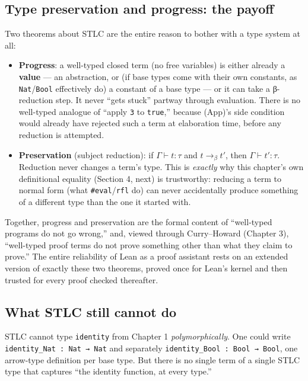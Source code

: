 \subsection{Type preservation and progress: the payoff}\label{sec:05-rigor-check:03-typing-rules-and-safety:5}

Two theorems about STLC are the entire reason to bother with a type system at all:

\begin{itemize}
\tightlist
\item
  \textbf{Progress}: a well-typed closed term (no free variables) is either already a \textbf{value} --- an abstraction, or (if base types come with their own constants, as \texttt{Nat}/\texttt{Bool} effectively do) a constant of a base type --- or it can take a β-reduction step. It never ``gets stuck'' partway through evaluation. There is no well-typed analogue of ``apply \texttt{3} to \texttt{true},'' because (App)'s side condition would already have rejected such a term at elaboration time, before any reduction is attempted.
\item
  \textbf{Preservation} (subject reduction): if \(\Gamma \vdash t : \tau\) and \(t \longrightarrow_\beta t'\), then \(\Gamma \vdash t' : \tau\). Reduction never changes a term's type. This is \emph{exactly} why this chapter's own definitional equality (Section 4, next) is trustworthy: reducing a term to normal form (what \texttt{\#eval}/\texttt{rfl} do) can never accidentally produce something of a different type than the one it started with.
\end{itemize}

Together, progress and preservation are the formal content of ``well-typed programs do not go wrong,'' and, viewed through Curry--Howard (Chapter 3), ``well-typed proof terms do not prove something other than what they claim to prove.'' The entire reliability of Lean as a proof assistant rests on an extended version of exactly these two theorems, proved once for Lean's kernel and then trusted for every proof checked thereafter.

\subsection{What STLC still cannot do}\label{sec:05-rigor-check:03-typing-rules-and-safety:6}

STLC cannot type \texttt{identity} from Chapter 1 \emph{polymorphically}. One could write \texttt{identity\_\allowbreak{}Nat : Nat → Nat} and separately \texttt{identity\_\allowbreak{}Bool : Bool → Bool}, one arrow-type definition per base type. But there is no single term of a single STLC type that captures ``the identity function, at every type.''

